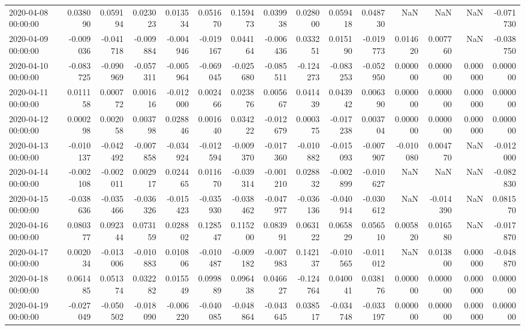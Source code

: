 \begin{tabular}{lrrrrrrrrrrrrrr}
2020-04-08 00:00:00 & 0.038090 & 0.059194 & 0.023023 & 0.013534 & 0.051670 & 0.159473 & 0.039938 & 0.028000 & 0.059418 & 0.048730 & NaN & NaN & NaN & -0.071730 \\
2020-04-09 00:00:00 & -0.009036 & -0.041718 & -0.009884 & -0.004946 & -0.019167 & 0.044164 & -0.006436 & 0.033251 & 0.015190 & -0.019773 & 0.014620 & 0.007760 & NaN & -0.038750 \\
2020-04-10 00:00:00 & -0.083725 & -0.090969 & -0.057311 & -0.005964 & -0.069045 & -0.025680 & -0.085511 & -0.124273 & -0.083253 & -0.052950 & 0.000000 & 0.000000 & 0.000000 & 0.000000 \\
2020-04-11 00:00:00 & 0.011158 & 0.000772 & 0.001616 & -0.012000 & 0.002466 & 0.023876 & 0.005667 & 0.041439 & 0.043942 & 0.006390 & 0.000000 & 0.000000 & 0.000000 & 0.000000 \\
2020-04-12 00:00:00 & 0.000298 & 0.002058 & 0.003798 & 0.028846 & 0.001640 & 0.034222 & -0.012679 & 0.000375 & -0.017238 & 0.003704 & 0.000000 & 0.000000 & 0.000000 & 0.000000 \\
2020-04-13 00:00:00 & -0.010137 & -0.042492 & -0.007858 & -0.034924 & -0.012594 & -0.009370 & -0.017360 & -0.010882 & -0.015093 & -0.007907 & -0.010080 & 0.004770 & NaN & -0.012000 \\
2020-04-14 00:00:00 & -0.002108 & -0.002011 & 0.002917 & 0.024465 & 0.011670 & -0.039314 & -0.001210 & 0.028832 & -0.002899 & -0.010627 & NaN & NaN & NaN & -0.082830 \\
2020-04-15 00:00:00 & -0.038636 & -0.035466 & -0.036326 & -0.015423 & -0.035930 & -0.038462 & -0.047977 & -0.036136 & -0.040914 & -0.030612 & NaN & -0.014390 & NaN & 0.081570 \\
2020-04-16 00:00:00 & 0.080377 & 0.092344 & 0.073159 & 0.028802 & 0.128547 & 0.115200 & 0.083991 & 0.063122 & 0.065829 & 0.056510 & 0.005820 & 0.016580 & NaN & -0.017870 \\
2020-04-17 00:00:00 & 0.002034 & -0.013006 & -0.010883 & 0.010806 & -0.010487 & -0.009182 & -0.007983 & 0.142137 & -0.010565 & -0.011012 & NaN & 0.013800 & 0.000000 & -0.048870 \\
2020-04-18 00:00:00 & 0.061485 & 0.051374 & 0.032282 & 0.015549 & 0.099889 & 0.096438 & 0.046627 & -0.124764 & 0.040041 & 0.038176 & 0.000000 & 0.000000 & 0.000000 & 0.000000 \\
2020-04-19 00:00:00 & -0.027049 & -0.050502 & -0.018090 & -0.006220 & -0.040085 & -0.048864 & -0.043645 & 0.038517 & -0.034748 & -0.033197 & 0.000000 & 0.000000 & 0.000000 & 0.000000 \\

\end{tabular}
